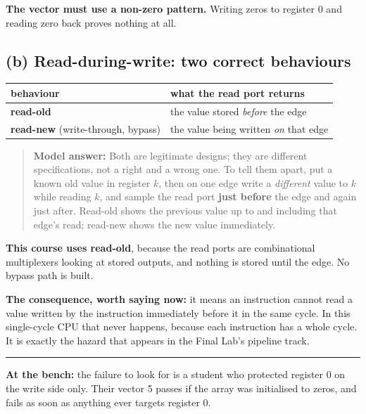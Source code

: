 \documentclass[11pt]{article}
\newcommand{\hr}{\vspace{2pt}\hrule\vspace{6pt}}
\begin{document}
\textbf{The vector must use a non-zero pattern.} Writing zeros to register 0 and
reading zero back proves nothing at all.

\subsection*{(b) Read-during-write: two correct behaviours}

\begin{center}
\begin{tabular}{ll}
\toprule
behaviour & what the read port returns \\
\midrule
\textbf{read-old} & the value stored \emph{before} the edge \\
\textbf{read-new} (write-through, bypass) & the value being written \emph{on} that edge \\
\bottomrule
\end{tabular}
\end{center}

\begin{quote}
\textbf{Model answer:} Both are legitimate designs; they are different
specifications, not a right and a wrong one. To tell them apart, put a known old
value in register $k$, then on one edge write a \emph{different} value to $k$
while reading $k$, and sample the read port \textbf{just before} the edge and
again just after. Read-old shows the previous value up to and including that
edge's read; read-new shows the new value immediately.
\end{quote}

\textbf{This course uses read-old}, because the read ports are combinational
multiplexers looking at stored outputs, and nothing is stored until the edge. No
bypass path is built.

\textbf{The consequence, worth saying now:} it means an instruction cannot read a
value written by the instruction immediately before it in the same cycle. In this
single-cycle CPU that never happens, because each instruction has a whole cycle.
It is exactly the hazard that appears in the Final Lab's pipeline track.

\vspace{6pt}
\hr
{\small \textbf{At the bench:} the failure to look for is a student who protected
register 0 on the write side only. Their vector 5 passes if the array was
initialised to zeros, and fails as soon as anything ever targets register 0.}
\end{document}
